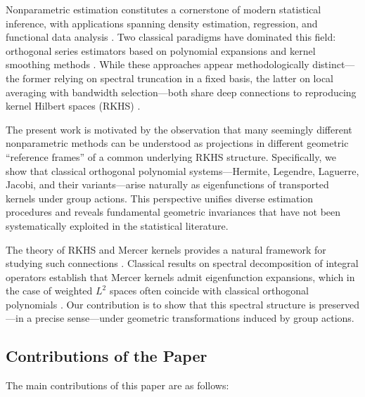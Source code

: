 \documentclass[11pt,a4paper]{article}
\begin{document}
Nonparametric estimation constitutes a cornerstone of modern statistical inference, with applications spanning density estimation, regression, and functional data analysis \citep{Tsybakov2009,Wasserman2006}. Two classical paradigms have dominated this field: orthogonal series estimators based on polynomial expansions \citep{Efromovich1999,Johnstone2017} and kernel smoothing methods \citep{Wand1995,Silverman1986}. While these approaches appear methodologically distinct---the former relying on spectral truncation in a fixed basis, the latter on local averaging with bandwidth selection---both share deep connections to reproducing kernel Hilbert spaces (RKHS) \citep{Berlinet2004,Cucker2002}.

The present work is motivated by the observation that many seemingly different nonparametric methods can be understood as projections in different geometric ``reference frames'' of a common underlying RKHS structure. Specifically, we show that classical orthogonal polynomial systems---Hermite, Legendre, Laguerre, Jacobi, and their variants---arise naturally as eigenfunctions of transported kernels under group actions. This perspective unifies diverse estimation procedures and reveals fundamental geometric invariances that have not been systematically exploited in the statistical literature.

The theory of RKHS and Mercer kernels provides a natural framework for studying such connections \citep{Aronszajn1950,Steinwart2008}. Classical results on spectral decomposition of integral operators \citep{Riesz1955,Dunford1988} establish that Mercer kernels admit eigenfunction expansions, which in the case of weighted $L^2$ spaces often coincide with classical orthogonal polynomials \citep{Szego1975,Ismail2005}. Our contribution is to show that this spectral structure is preserved---in a precise sense---under geometric transformations induced by group actions.

\subsection{Contributions of the Paper}

The main contributions of this paper are as follows:
\end{document}
